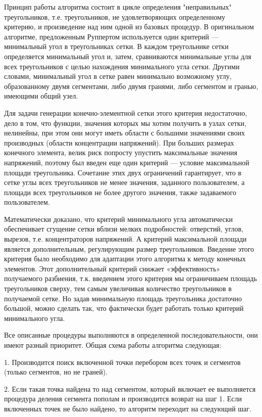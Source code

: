 \documentclass[14pt]{extreport}
\begin{document}
Принцип работы алгоритма состоит в цикле определения "неправильных" треугольников, т.е. треугольников, не удовлетворяющих определенному критерию, и произведение над ним одной из базовых процедур. В оригинальном алгоритме, предложенным Руппертом используется один критерий — минимальный угол в треугольниках сетки. В каждом треугольнике сетки определяется минимальный угол и, затем, сравниваются минимальные углы для всех треугольников с целью нахождения минимального угла сетки. Другими словами, минимальный угол в сетке равен минимально возможному углу, образованному двумя сегментами, либо двумя гранями, либо сегментом и гранью, имеющими общий узел.

Для задачи генерации конечно-элементной сетки этого критерия недостаточно, дело в том, что функции, значения которых мы хотим получить в узлах сетки, нелинейны, при этом они могут иметь области с большими значениями своих производных (области концентрации напряжений). При больших размерах конечного элемента, велик риск попросту упустить максимальные значения напряжений, поэтому был введен еще один критерий — условие максимальной площади треугольника. Сочетание этих двух ограничений гарантирует, что в сетке углы всех треугольников не менее значения, заданного пользователем, а площади всех треугольников не более другого значения, также задаваемого пользователем.

Математически доказано, что критерий минимального угла автоматически обеспечивает сгущение сетки вблизи мелких подробностей: отверстий, углов, вырезов, т.е. концентраторов напряжений. А критерий максимальной площади является дополнительным, регулирующим размер треугольников. Введение этого критерия было необходимо для адаптации этого алгоритма к методу конечных элементов. Этот дополнительный критерий снижает «эффективность» получаемого разбиения, т.к. введением этого критерия мы ограничиваем площадь треугольников сверху, тем самым увеличивая количество треугольников в получаемой сетке. Но задав минимальную площадь треугольника достаточно большой, можно сделать так, что фактически будет работать только критерий минимального угла.

Все описанные процедуры выполняются в определенной последовательности, они имеют разный приоритет. Общая схема работы алгоритма следующая:

1. Производится поиск включенной точки перебором всех точек и сегментов (только сегментов, но не граней).

2. Если такая точка найдена то над сегментом, который включает ее выполняется процедура деления сегмента пополам и производится возврат на шаг 1. Если включенных точек не было найдено, то алгоритм переходит на следующий шаг.
\end{document}

